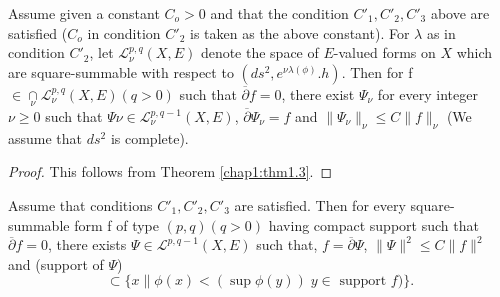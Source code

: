 \begin{lemma}\label{chap1:lem1.6}%
  Assume given a constant $ C_o>0$ and that the condition $
  C'_1,  C'_2,  C'_3$ above are satisfied ($C_o$ in
  condition $C'_2$ is taken as the above constant). For $\lambda$ as
  in condition $C'_2$, let $\mathcal{L}^{p,q}_{\nu}(X,E)$ denote
  the space of $E$-valued forms on $X$ which are square-summable with
  respect to $(ds^2, e^{\nu \lambda(\phi)}. h)$.  Then
  for f$\in {\underset{\nu}{\cap}} \mathcal{L}^{p,q}_\nu(X,E) (q>0)$
  such that $\overline \partial f=0$, there exist $\Psi _\nu$ for every
  integer $\nu \geq 0$ such that $\Psi \nu \in
  \mathcal{L}^{p,q-1}_\nu(X,E)$, $\overline{\partial} \Psi_\nu =f$ and
  $\parallel \Psi_\nu\parallel_\nu \le C \parallel f \parallel_\nu$ (We
  assume that $ds^2$ is complete). 
\end{lemma}

\begin{proof}
  This follows from Theorem \ref{chap1:thm1.3}.
\end{proof}

\begin{theorem}\label{chap1:thm1.4} %
  Assume that conditions $ C'_1, C'_2,  C'_3$ are
  satisfied. Then for every square-summable form f of type $(p,q)(q>0)$
  having compact support such that $\overline {\partial} f=0$, there
  exists $\Psi \in \mathcal{L}^{p,q-1}(X,E)$ such that, $f=\overline
  {\partial} \Psi$, $\parallel \Psi \parallel^2 \leq C \parallel f
  \parallel^2$ and (support of $\Psi$)  
$$
\subset\{x\|\phi(x)<(\sup \phi(y))  \; y \in  \text{ support } f)\}.
$$ 
\end{theorem}

